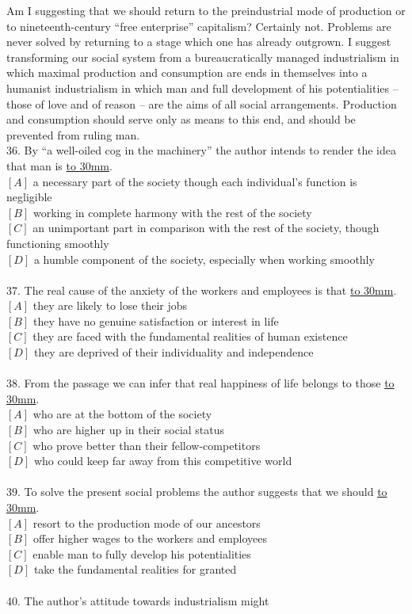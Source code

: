 \documentclass[a4paper]{article}
\begin{document}
\par
Am I suggesting that we should return to the preindustrial mode of production or to nineteenth-century “free enterprise” capitalism? Certainly not. Problems are never solved by returning to a stage which one has already outgrown. I suggest transforming our social system from a bureaucratically managed industrialism in which maximal production and consumption are ends in themselves into a humanist industrialism in which man and full development of his potentialities -- those of love and of reason -- are the aims of all social arrangements. Production and consumption should serve only as means to this end, and should be prevented from ruling man.
\\36.	By “a well-oiled cog in the machinery” the author intends to render the idea that man is \underline{\hbox to 30mm{}}.\\$[A]$ a necessary part of the society though each individual’s function is negligible\\$[B]$ working in complete harmony with the rest of the society\\$[C]$ an unimportant part in comparison with the rest of the society, though functioning smoothly\\$[D]$ a humble component of the society, especially when working smoothly\\\\37.	The real cause of the anxiety of the workers and employees is that \underline{\hbox to 30mm{}}.\\$[A]$ they are likely to lose their jobs\\$[B]$ they have no genuine satisfaction or interest in life\\$[C]$ they are faced with the fundamental realities of human existence\\$[D]$ they are deprived of their individuality and independence\\\\38.	From the passage we can infer that real happiness of life belongs to those \underline{\hbox to 30mm{}}.\\$[A]$ who are at the bottom of the society\\$[B]$ who are higher up in their social status\\$[C]$ who prove better than their fellow-competitors\\$[D]$ who could keep far away from this competitive world\\\\39.	To solve the present social problems the author suggests that we should \underline{\hbox to 30mm{}}.\\$[A]$ resort to the production mode of our ancestors\\$[B]$ offer higher wages to the workers and employees\\$[C]$ enable man to fully develop his potentialities\\$[D]$ take the fundamental realities for granted\\\\40.	The author’s attitude towards industrialism might 
\end{document}
